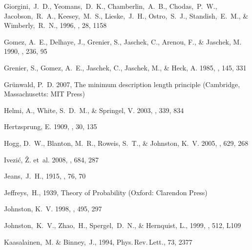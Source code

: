 \begin{thebibliography}{99}
  Giorgini,~J.~D., Yeomans,~D.~K., Chamberlin,~A.~B., Chodas,~P.~W., Jacobson,~R.~A., Keesey,~M.~S., Lieske,~J.~H., Ostro,~S.~J., Standish,~E.~M., \& Wimberly,~R.~N., 1996, 
  \baas, 28, 1158

{Gomez}, A.~E., {Delhaye}, J., {Grenier}, S., {Jaschek}, C., {Arenou}, F., \&
  {Jaschek}, M. 1990, \aap, 236, 95

{Grenier}, S., {Gomez}, A.~E., {Jaschek}, C., {Jaschek}, M., \& {Heck}, A.
  1985, \aap, 145, 331

{Gr{\"u}nwald}, P.~D. 2007, {The minimum description length principle}
  (Cambridge, Massachusetts: {MIT Press})

{Helmi}, A., {White}, S.~D.~M., \& {Springel}, V. 2003, \mnras, 339, 834

{Hertzsprung}, E. 1909, \apj, 30, 135

{Hogg}, D.~W., {Blanton}, M.~R., {Roweis}, S.~T., \& {Johnston}, K.~V. 2005,
  \apj, 629, 268

{Ivezi{\'c}}, {\v Z}. {et~al.} 2008, \apj, 684, 287

  Jeans,~J.~H., 1915,
  \mnras, 76, 70

  Jeffreys,~H., 1939,
  Theory of Probability (Oxford: Clarendon Press)

{Johnston}, K.~V. 1998, \apj, 495, 297

  Johnston,~K.~V., Zhao,~H., Spergel,~D.~N., \& Hernquist, L., 1999,
  \apjl, 512, L109 

  Kaasalainen,~M. \& Binney,~J., 1994,
  Phys.\,Rev.\,Lett., 73, 2377


\end{thebibliography}
